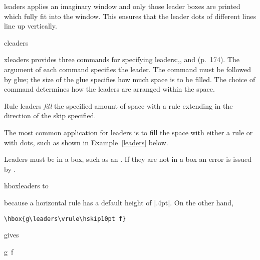 \begin{docCommand}{leaders}{}
\tex applies an imaginary window and only those leader boxes are printed which fully fit into the window. This ensures that the leader dots of different lines line up vertically.
\end{docCommand}


\begin{docCommand}{cleaders}{}
\end{docCommand}

\begin{docCommand}{xleaders}{}
\tex  provides three commands for specifying leaders:,,
and (p.~174). The argument of each command specifies the
leader. The command must be followed by glue; the size of the glue specifies
how much space is to be filled. The choice of command determines how
the leaders are arranged within the space.
\end{docCommand}

Rule leaders \textit{fill} the specified amount of space with a rule extending in the direction of the skip
specified. 

The most common application for leaders is to fill the space with either a rule or with dots, such as shown in Example~\ref{leaders} below.


Leaders must be in a box, such as an . If they are not in a box an error is issued by \tex.

\begin{texexample}{}{hboxleaders}
\hbox to 
\end{texexample}

because a horizontal rule has a default height of |.4pt|. On the other hand,

\verb+\hbox{g\leaders\vrule\hskip10pt f}+

gives

\hbox{g\leaders\vrule\hskip10pt f}

